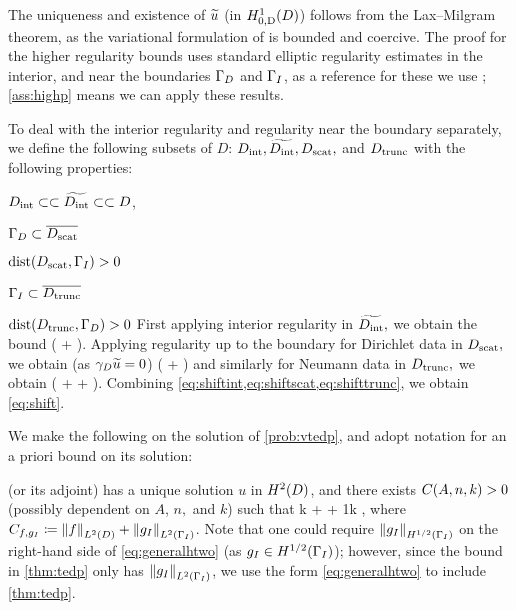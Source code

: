 The uniqueness and existence of $\widetilde{u}$ (in $\HozDD$) follows from the Lax--Milgram theorem, as the variational formulation of is bounded and coercive. The proof for the higher regularity bounds uses standard elliptic regularity estimates in the interior, and near the boundaries $\Gamma_{D}$ and $\Gamma_{I}$, as a reference for these we use \cite[pp. 137-138]{Mc:00}; \cref{ass:highp} means we can apply these results.

To deal with the interior regularity and regularity near the boundary separately, we define the following subsets of $D$: $D_{\mathrm{int}},\widetilde{D_{\mathrm{int}}},D_{\mathrm{scat}},$ and $D_{\mathrm{trunc}}$ with the following properties:
\bit
\item $D_{\mathrm{int}} \subset\subset \widetilde{D_{\mathrm{int}}} \subset\subset D$,
\item $\Gamma_{D} \subset \overline{D_{\mathrm{scat}}}$
\item $\operatorname{dist}(D_{\mathrm{scat}},\Gamma_{I}) > 0 $
  \item $\Gamma_{I} \subset \overline{D_{\mathrm{trunc}}}$
\item $\operatorname{dist}(D_{\mathrm{trunc}},\Gamma_{D}) > 0 $
    \eit
    First applying interior regularity \cite[Theorem 4.16]{Mc:00} in $\widetilde{D_{\mathrm{int}}},$ we obtain the bound
    \beq\label{eq:shiftint}
\NHlptDint{\utilde} \leq \CintAl \mleft(\NHoDinttilde{\utilde} + \NHlDinttilde{\ftilde}\mright).
\eeq
Applying regularity up to the boundary for Dirichlet data \cite[Theorem 4.18 (i)]{Mc:00} in $D_{\mathrm{scat}},$ we obtain (as $\gamma_{D} \widetilde{u} = 0$)
\beq\label{eq:shiftscat}
\NHlptDscat{\utilde} \leq \CscatAl \mleft(\NHoD{\utilde} + \NHlD{\ftilde}\mright)
\eeq
and similarly for Neumann data \cite[Theorem 4.18 (ii)]{Mc:00} in $D_{\mathrm{trunc}},$ we obtain
\beq\label{eq:shifttrunc}
\NHlptDtrunc{\utilde} \leq \CtruncAl \mleft(\NHoD{\utilde} + \NHlphGI{\dn \utilde} + \NHlD{\ftilde}\mright).
\eeq
Combining \cref{eq:shiftint,eq:shiftscat,eq:shifttrunc}, we obtain \cref{eq:shift}.
\epf

We make the following  on the solution of \cref{prob:vtedp}, and adopt notation for an a priori bound on its solution:

\bas\label{ass:htwo}
 (or its adjoint) has a unique solution $u$ in $\HtD$, and there exists $\CAnk>0$ (possibly dependent on $A$, $n,$ and $k$) such that
\beq\label{eq:generalhtwo}
k  +  + \frac1k  \leq \CAnk \Cfg,
\eeq
where $\Cfg \de \NLtD{f} + \NLtGI{\gI}$.
\eas
Note that one could require $\NHhGI{\gI}$ on the right-hand side of \cref{eq:generalhtwo} (as $\gI \in \HhGI$); however, since the bound in \cref{thm:tedp} only has $\NLtGI{\gI}$, we use the form \cref{eq:generalhtwo} to include \cref{thm:tedp}.

